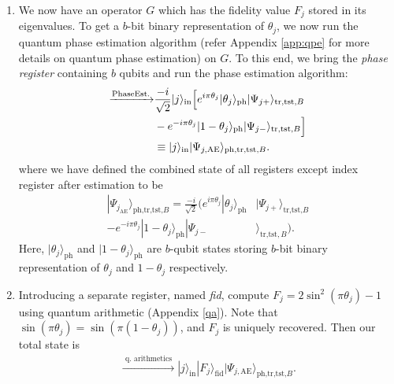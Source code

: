 \documentclass[a4paper,twocolumn,11pt,unpublished]{quantumarticle}
\newcommand{\rang}{\rangle}
\begin{document}
\begin{enumerate}
        \item
            \label{step6}
            We now have an operator $G$ which has the fidelity value $F_j$ stored in its eigenvalues. To get a $b$-bit binary representation of $\theta_j$, we now run the quantum phase estimation algorithm (refer Appendix \ref{app:qpe} for more details on quantum phase estimation) on $G$. To this end, we bring the \textit{phase register} containing $b$ qubits and run the phase estimation algorithm:
            \begin{equation}                
                \begin{aligned}
                \xrightarrow{\text{PhaseEst.}}
                &\frac{-i}{\sqrt{2}}  |j\rang_{\text{in}} \Big[
                e^{i\pi \theta_j} |\theta_j\rang_{\text{ph}}  |\Psi_{j+}\rang_{\text{tr,tst,} B} 
                \\ &- e^{-i\pi\theta_j} |1-\theta_j\rang _{\text{ph} }|\Psi_{j-}\rang_{\text{tr,tst}, B}\Big]\\
                &\equiv  |j\rang_\text{in} |\Psi_{j,\text{AE}}\rang_{\text{\text{ph,tr,tst,}}B}. 
                \end{aligned}
                \label{Eq:est}
            \end{equation}
            where we have defined the combined state of all registers except index register after estimation to be
            \begin{equation}
            \begin{split}
                |\Psi_{j_{\text{AE}}}\rang_{\text{ph,tr,tst,}B} =
                \frac{-i}{\sqrt 2}\Big(e^{i\pi \theta_j}|\theta_j\rang_{\text{ph}}  &|\Psi_{j+}\rang_{\text{tr,tst,} B} 
                   \\ - e^{-i\pi\theta_j} |1-\theta_j\rang_{\text{ph} }|\Psi_{j-}&\rang_{\text{tr,tst}, B}\Big).
            \end{split}
            \end{equation}
            Here, $|\theta_j \rang_\text{ph}$ and $|1- \theta_j\rang_\text{ph}$ are $b$-qubit states storing $b$-bit binary representation of $\theta_j$ and $1- \theta_j$ respectively.

            
            \item
            Introducing a separate register, named \textit{fid}, compute $F_j = 2 \sin^2(\pi\theta_j) - 1$ using quantum arithmetic (Appendix \ref{qa}). Note that $\sin (\pi\theta_j) = \sin(\pi(1-\theta_j))$, and $F_j$ is uniquely recovered. Then our total state is 
            \begin{equation}
            \begin{split}
                \xrightarrow {\text{ q. arithmetics }}
                |j\rang_\text{in} |F_j\rang_\text{fid} |\Psi_{j, \text{AE}}\rang_{\text{ph,tr,tst,}B}.
            \end{split}
            \end{equation}
            

\end{enumerate}
\end{document}
